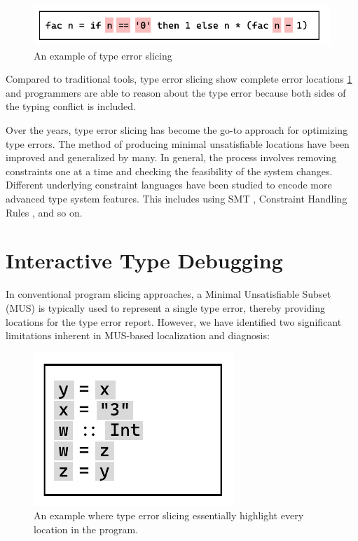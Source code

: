 \begin{figure}[hbt]
  \includegraphics[width=0.5\linewidth]{TypeErrorSlicing.pdf}
  \caption{
    \label{fig:type-error-slicing}
      An example of type error slicing}
\end{figure}

Compared to traditional tools, type error slicing show complete error locations \ref{fig:type-error-slicing} and programmers are able to reason about the type error because both sides of the typing conflict is included. 

Over the years, type error slicing has become the go-to approach for optimizing type errors. The method of producing minimal unsatisfiable locations have been improved and generalized by many. In general, the process involves removing constraints one at a time and checking the feasibility of the system changes. Different underlying constraint languages have been studied to encode more advanced type system features. This includes using SMT \cite{Pavlinovic2015-ke}, Constraint Handling Rules \cite{Stuckey2003-pz}, and so on. 



\section{Interactive Type Debugging}

In conventional program slicing approaches, a Minimal Unsatisfiable Subset (MUS) is typically used to represent a single type error, thereby providing locations for the type error report. However, we have identified two significant limitations inherent in MUS-based localization and diagnosis:


\begin{figure}[hbt]
  \includegraphics[width=0.5\linewidth]{SlicingCounterExample}
  \caption{
    \label{fig:slicing-counter-example}
      An example where type error slicing essentially highlight every location in the program.}
\end{figure}

